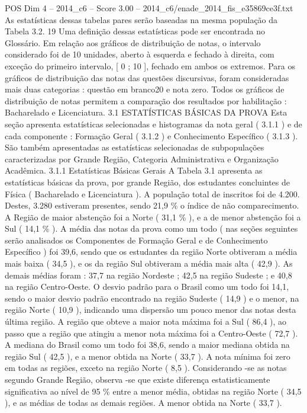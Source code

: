 \begin{textsample}{POS Dim 4 – 2014\_c6 – Score 3.00 – 2014\_c6/enade\_2014\_fis\_e35869ce3f.txt}
As estatísticas dessas tabelas pares serão baseadas na mesma população da Tabela 3.2. 19 Uma definição dessas estatísticas pode ser encontrada no Glossário.
Em relação aos gráficos de distribuição de notas, o intervalo considerado foi de 10 unidades, aberto à esquerda e fechado à direita, com exceção do primeiro intervalo, [ 0 ; 10 ], fechado em ambos os extremos.
Para os gráficos de distribuição das notas das questões discursivas, foram consideradas mais duas categorias : questão em branco20 e nota zero.
Todos os gráficos de distribuição de notas permitem a comparação dos resultados por habilitação : Bacharelado e Licenciatura. 3.1 ESTATÍSTICAS BÁSICAS DA PROVA Esta seção apresenta estatísticas selecionadas e histogramas da nota geral ( 3.1.1 ) e de cada componente : Formação Geral ( 3.1.2 ) e Conhecimento Específico ( 3.1.3 ).
São também apresentadas as estatísticas selecionadas de subpopulações caracterizadas por Grande Região, Categoria Administrativa e Organização Acadêmica. 3.1.1 Estatísticas Básicas Gerais A Tabela 3.1 apresenta as estatísticas básicas da prova, por grande Região, dos estudantes concluintes de Física ( Bacharelado e Licenciatura ).
A população total de inscritos foi de 4.200.
Destes, 3.280 estiveram presentes, sendo 21,9 \% o índice de não comparecimento.
A Região de maior abstenção foi a Norte ( 31,1 \% ), e a de menor abstenção foi a Sul ( 14,1 \% ).
A média das notas da prova como um todo ( nas seções seguintes serão analisados os Componentes de Formação Geral e de Conhecimento Específico ) foi 39,6, sendo que os estudantes da região Norte obtiveram a média mais baixa ( 34,5 ), e os da região Sul obtiveram a média mais alta ( 42,9 ).
As demais médias foram : 37,7 na região Nordeste ; 42,5 na região Sudeste ; e 40,8 na região Centro-Oeste.
O desvio padrão para o Brasil como um todo foi 14,1, sendo o maior desvio padrão encontrado na região Sudeste ( 14,9 ) e o menor, na região Norte ( 10,9 ), indicando uma dispersão um pouco menor das notas desta última região.
A região que obteve a maior nota máxima foi a Sul ( 86,4 ), ao passo que a região que atingiu a menor nota máxima foi a Centro-Oeste ( 72,7 ).
A mediana do Brasil como um todo foi 38,6, sendo a maior mediana obtida na região Sul ( 42,5 ), e a menor obtida na Norte ( 33,7 ).
A nota mínima foi zero em todas as regiões, exceto na região Norte ( 8,5 ).
Considerando -se as notas segundo Grande Região, observa -se que existe diferença estatisticamente significativa ao nível de 95 \% entre a menor média, obtidas na região Norte ( 34,5 ), e as médias de todas as demais regiões.
A menor obtida na Norte ( 33,7 ).

\end{textsample}
